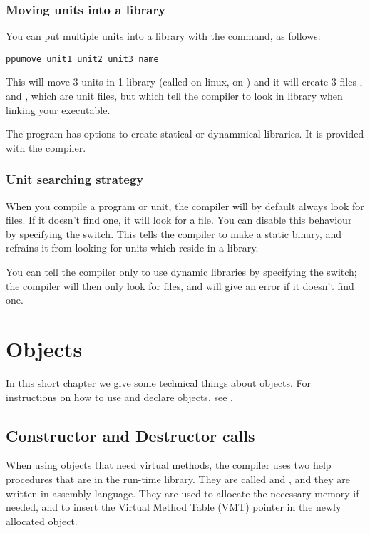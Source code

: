 \documentclass{report}
\begin{document}
\subsection{Moving units into a library}
You can put multiple units into a library with the  command, as
follows:

\begin{verbatim}
ppumove unit1 unit2 unit3 name
\end{verbatim}
This will move 3 units in 1 library (called  on linux,
 on \windows) and it will create 3 files ,
 and , which are unit files, but which tell
the compiler to look in library  when linking your executable.

The  program has options to create statical or dynammical
libraries. It is provided with the compiler.

\subsection{Unit searching strategy}

When you compile a program or unit, the compiler will by
default always look for  files. If it doesn't find one, it will
look for a  file. You can disable this behaviour by
specifying the  switch. This tells the compiler to make a static
binary, and refrains it from looking for units which reside in a library.

You can tell the compiler only to use dynamic libraries by specifying
the  switch; the compiler will then only look for  files,
and will give an error if it doesn't find one.

\chapter{Objects}
\label{ch:Objects}
In this short chapter we give some technical things about objects. For
instructions on how to use and declare objects, see .

\section{Constructor and Destructor calls}
\label{se:ConsDest}
When using objects that need virtual methods, the compiler uses two help
procedures that are in the run-time library. They are called
 and , and they are written in
assembly language. They are used to allocate the necessary memory if needed,
and to insert the Virtual Method Table (VMT) pointer in the newly allocated
object.
\end{document}
